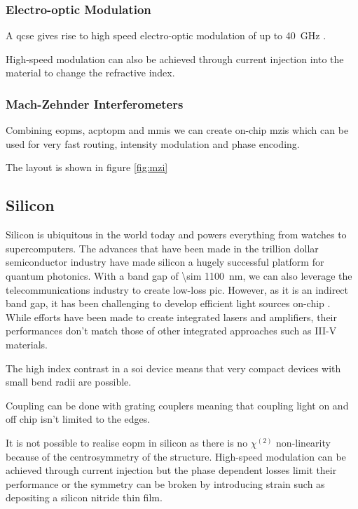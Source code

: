 \subsubsection*{Electro-optic Modulation}

A \ac{qcse} gives rise to high speed electro-optic modulation of up to \SI{40}{GHz} \cite{jeppix}.

High-speed modulation can also be achieved through current injection into the material to change the refractive index. 

\subsubsection*{Mach-Zehnder Interferometers}

Combining \acp{eopm}, acp{topm} and \acp{mmi} we can create on-chip \acp{mzi} which can be used for very fast routing, intensity modulation and phase encoding. 

The layout is shown in figure \ref{fig:mzi}

\subsection{Silicon}

Silicon is ubiquitous in the world today and powers everything from watches to supercomputers. The advances that have been made in the trillion dollar semiconductor industry have made silicon a hugely successful platform for quantum photonics. With a band gap of \SI{\sim 1100}{nm}, we can also leverage the telecommunications industry to create low-loss \acl{pic}. However, as it is an indirect band gap, it has been challenging to develop efficient light sources on-chip \cite{}. While efforts have been made to create integrated lasers and amplifiers, their performances don't match those of other integrated approaches such as III-V materials.

The high index contrast in a \ac{soi} device means that very compact devices with small bend radii are possible.

Coupling can be done with grating couplers meaning that coupling light on and off chip isn't limited to the edges.

It is not possible to realise \ac{eopm} in silicon as there is no $\chi^{(2)}$ non-linearity because of the centrosymmetry of the structure. High-speed modulation can be achieved through current injection but the phase dependent losses limit their performance \cite{} or the symmetry can be broken by introducing strain such as depositing a silicon nitride thin film.


